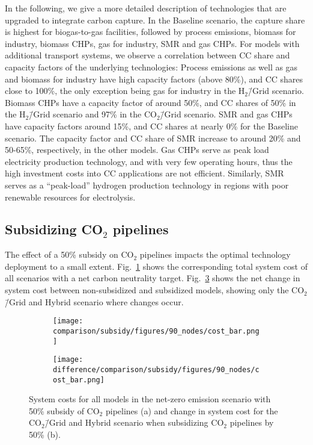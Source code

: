 \documentclass[twocolumn]{article}
\newcommand{\carbon}{CO$_2$}
\newcommand{\carbongrid}{CO$_2$\=/Grid}
\newcommand{\baselinescenario}{Baseline scenario}
\newcommand{\carbonscenario}{CO$_2$\=/Grid scenario}
\newcommand{\hydrogenscenario}{H$_2$\=/Grid scenario}
\newcommand{\hybridscenario}{Hybrid scenario}
\begin{document}
In the following, we give a more detailed description of technologies that are upgraded to integrate carbon capture.
In the \baselinescenario{}, the capture share is highest for biogas-to-gas facilities, followed by process emissions, biomass for industry, biomass CHPs, gas for industry, SMR and gas CHPs. For models with additional transport systems, we observe a correlation between CC share and capacity factors of the underlying technologies: Process emissions as well as gas and biomass for industry have high capacity factors (above 80\%), and CC shares close to 100\%, the only exception being gas for industry in the \hydrogenscenario{}. Biomass CHPs have a capacity factor of around 50\%, and CC shares of 50\% in the \hydrogenscenario{} and 97\% in the \carbonscenario{}. SMR and gas CHPs have capacity factors around 15\%, and CC shares at nearly 0\% for the \baselinescenario{}. The capacity factor and CC share of SMR increase to around 20\% and 50-65\%, respectively, in the other models. Gas CHPs serve as peak load electricity production technology, and with very few operating hours, thus the high investment costs into CC applications are not efficient. Similarly, SMR serves as a ``peak-load'' hydrogen production technology in regions with poor renewable resources for electrolysis.


\subsection{Subsidizing \carbon{} pipelines}
\label{sec:subsidy}

The effect of a 50\% subsidy on \carbon{} pipelines impacts the optimal technology deployment to a small extent. Fig.~\ref{fig:cost_bar_subsidy} shows the corresponding total system cost of all scenarios with a net carbon neutrality target. Fig.~\ref{fig:cost_bar_diff_subsidy} shows the net change in system cost between non-subsidized and subsidized models, showing only the \carbongrid{} and \hybridscenario{} where changes occur.

\begin{figure}[ht!]
    \centering
    \begin{subfigure}{.5\textwidth}
    \texttt{[image: comparison/subsidy/figures/90\_nodes/cost\_bar.png]}
    \caption{}
    \label{fig:cost_bar_subsidy}
\end{subfigure}%
\begin{subfigure}{.5\textwidth}
    \centering
    \texttt{[image: difference/comparison/subsidy/figures/90\_nodes/cost\_bar.png]}
    \caption{}
    \label{fig:cost_bar_diff_subsidy}
\end{subfigure}
\caption{System costs for all models in the net-zero emission scenario with 50\% subsidy of \carbon{} pipelines (a) and change in system cost for the \carbongrid{} and \hybridscenario{} when subsidizing \carbon{} pipelines by 50\% (b).}
\end{figure}
\end{document}
